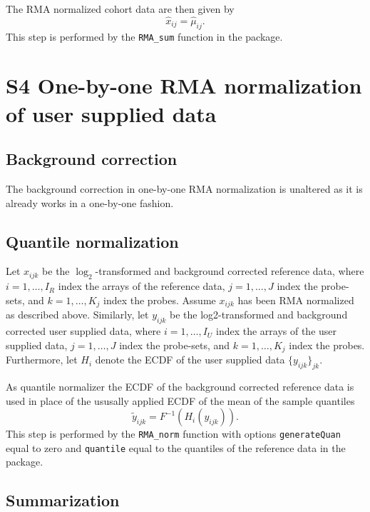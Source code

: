 \documentclass{article}
\begin{document}
The RMA normalized cohort data are then given by
\begin{equation*}
   \hat{x}_{ij} = \hat{\mu}_{ij}.
\end{equation*}
This step is performed by the \texttt{RMA\_sum} function in the \hemaClass{} package.




\section*{S4 One-by-one RMA normalization of user supplied data}
\subsection*{Background correction}

The background correction in one-by-one RMA normalization is unaltered as it is already works in a one-by-one fashion.


\subsection*{Quantile normalization}

Let $x_{ijk}$ be the $\log_2$-transformed and background corrected reference data, where $i = 1,\dots,I_R$ index the arrays of the reference data, $j=1,\dots,J$ index the probe-sets, and $k=1,\dots,K_j$ index the probes.
Assume $x_{ijk}$ has been RMA normalized as described above.
Similarly, let $y_{ijk}$ be the log2-transformed and background corrected user supplied data, where $i = 1,\dots,I_U$ index the arrays of the user supplied data, $j=1,\dots,J$  index the probe-sets, and $k=1,\dots,K_j$ index the probes.
Furthermore, let $H_i$ denote the ECDF of the user supplied data $\{y_{ijk}\}_{jk}$.

As quantile normalizer the ECDF of the background corrected reference data is used in place of the ususally applied ECDF of the mean of the sample quantiles
\begin{equation*}
   \tilde{y}_{ijk} = F^{-1}(H_i(y_{ijk})).
\end{equation*}
This step is performed by the \texttt{RMA\_norm} function with options \texttt{generateQuan} equal to zero and \texttt{quantile} equal to the quantiles of the reference data in the  package.


\subsection*{Summarization}
\end{document}

